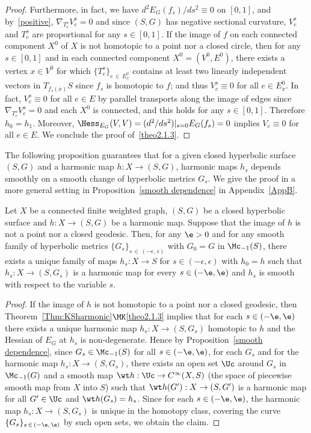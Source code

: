 \begin{proof}
Furthermore, in fact, we have $d^2E_G(f_s)/ds^2\equiv 0$ on $[0, 1]$, and by~\eqref{positive}, $\nabla_{T_e^s}V_e^s=0$ and since $(S, G)$ has negative sectional curvature, $V_e^s$ and $T_e^s$ are proportional for any $s \in [0, 1]$. If the image of $f$ on each connected component $X^0$ of $X$ is not homotopic to a point nor a closed circle, then for any $s \in [0, 1]$ and in each connected component $X^0=(V^0, E^0)$, there exists a vertex $x \in V^0$ for which $\{T_e^s\}_{e\,\in\,E^0_x}$ contains at least two linearly independent vectors in $T_{f_s(x)}S$ since $f_s$ is homotopic to $f$; and thus $V_e^s\equiv 0$ for all $e \in E^0_x$. In fact, $V_e^s \equiv 0$ for all $e \in E$ by parallel transports along the image of edges since $\nabla_{T_e^s}V_e^s=0$ and each $X^0$ is connected, and this holds for any $s \in [0, 1]$. Therefore $h_0=h_1$. Moreover, ${\Hess}_{E_G}(V, V)=(d^2/ds^2)|_{s=0}E_G(f_s)=0$ implies $V_e \equiv 0$ for all $e \in E$. We conclude the proof of~\eqref{theo2.1.3}.
\end{proof}



The following proposition guarantees that for a given closed hyperbolic surface $(S, G)$ and a harmonic map $h:X \to (S, G)$, harmonic maps $h_s$ depends smoothly on a smooth change of hyperbolic metrics $G_s$. We give the proof in a more general setting in Proposition~\ref{smooth dependence} in Appendix~\ref{AppB}.

\begin{prop}\label{Prop:smooth}
Let $X$ be a connected finite weighted graph, $(S, G)$ be a closed hyperbolic surface and $h: X \to (S, G)$ be a harmonic map. Suppose that the image of $h$ is not a point nor a closed geodesic. Then, for any $\e>0$ and for any smooth family of hyperbolic metrics $\{G_s\}_{s\,\in\,(-\epsilon,\,\epsilon)}$ with $G_0=G$ in $\Mc_{-1}(S)$, there exists a unique family of maps $h_s:X \to S$ for $s\in (-\epsilon,\epsilon)$ with $h_0=h$ such that $h_s:X \to (S, G_s)$ is a harmonic map for every $s \in (-\e, \e)$ and $h_s$ is smooth with respect to the variable $s$.
\end{prop}

\begin{proof}
If the image of $h$ is not homotopic to a point nor a closed geodesic, then Theorem~\ref{Thm:KSharmonic}$\MK$\eqref{theo2.1.3} implies that for each $s \in (-\e, \e)$ there exists a unique harmonic map $h_s: X \to (S, G_s)$ homotopic to $h$ and the Hessian of $E_G$ at $h_s$ is non-degenerate. Hence by Proposition~\ref{smooth dependence}, since $G_s \in \Mc_{-1}(S)$ for all $s \in (-\e, \e)$, for each $G_s$ and for the harmonic map $h_s: X \to (S, G_s)$, there exists an open set $\Uc$ around $G_s$ in $\Mc_{-1}(G)$ and a smooth map $\wt h: \Uc \to C^\infty(X, S)$ (the space of piecewise smooth map from $X$ into $S$) such that $\wt h(G'):X \to (S, G')$ is a harmonic map for all $G' \in \Uc$ and $\wt h(G_s)=h_s$. Since for each $s \in (-\e, \e)$, the harmonic map $h_s:X \to (S, G_s)$ is unique in the homotopy class, covering the curve $\{G_s\}_{s\,\in\,(-\e,\,\e)}$ by such open sets, we obtain the claim.
\end{proof}


